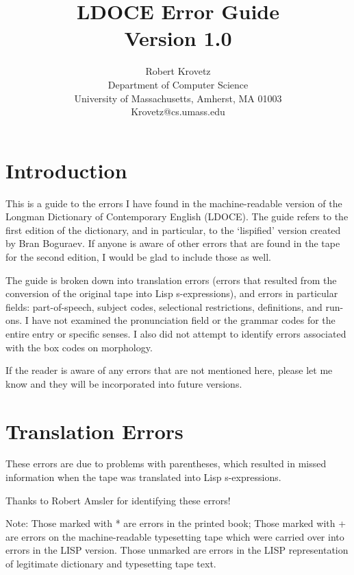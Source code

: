 \pagestyle{plain}
\title{LDOCE Error Guide \\ Version 1.0}
\author{Robert Krovetz\\
Department of Computer Science\\
University of Massachusetts, Amherst, MA 01003 \\
Krovetz@cs.umass.edu
}

\date{}

\maketitle
\section{Introduction}
This is a guide to the errors I have found in the machine-readable version of the
Longman Dictionary of Contemporary English (LDOCE).  The guide refers to the first 
edition of the dictionary, and in particular, to the `lispified' version created by
Bran Boguraev.  If anyone is aware of other errors that are found in the
tape for the second edition, I would be glad to include those as well.

The guide is broken down into translation errors (errors that resulted from the 
conversion of the original tape into Lisp s-expressions), and errors in particular
fields: part-of-speech, subject codes, selectional restrictions, definitions,
and run-ons.   I have not examined the pronunciation field or the
grammar codes for the entire entry or specific senses.  I also did not attempt
to identify errors associated with the box codes on morphology.

If the reader is aware of
any errors that are not mentioned here, please let me know and they will be
incorporated into future versions.


\section{Translation Errors}
These errors are due to problems with parentheses, which
resulted in missed information when the tape was translated
into Lisp s-expressions.

Thanks to Robert Amsler for identifying these errors!

Note: Those marked with * are errors in the printed book;
Those marked with + are errors on the machine-readable typesetting tape
which were carried over into errors in the LISP version.
Those unmarked are errors in the LISP representation of legitimate
dictionary and typesetting tape text.

